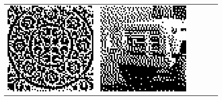 \begin{figure}
\begin{tabular}{c c c c c c}
		\includegraphics[width=\tilewidth,interpolate=false]{media/chp2/associative_memory/binam/02_02_out_scaled_crushed.png}&%
		\includegraphics[width=\tilewidth,interpolate=false]{media/chp2/associative_memory/binam/03_00_orig_scaled_crushed.png}&%

\end{tabular}
\end{figure}
